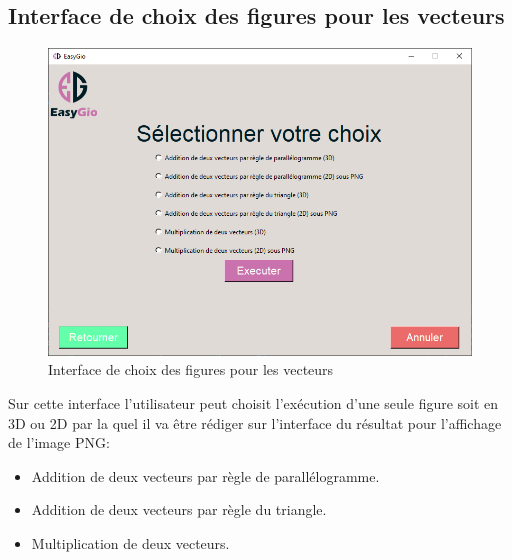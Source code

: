 \documentclass[a4paper]{report}
\begin{document}
\subsection{Interface de choix des figures pour les vecteurs}
\begin{figure}[!h]
    \centering
    \includegraphics[width=12cm]{images/Vecteur.PNG}
    \caption{Interface de choix des figures pour les vecteurs}
    \label{fig:Interface de choix des figures pour les vecteurs}
\end{figure}
Sur cette interface l'utilisateur peut choisit l'exécution d'une seule figure soit en 3D ou 2D par la quel il va être rédiger sur l'interface du résultat pour l'affichage de l'image PNG:
\begin{itemize}
    \item Addition de deux vecteurs par règle de parallélogramme.
    \item Addition de deux vecteurs par règle du triangle.
    \item Multiplication de deux vecteurs.
\end{itemize}
\newpage
\end{document}

